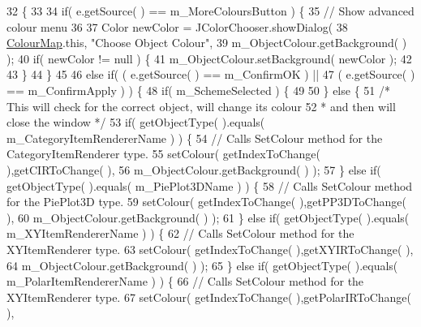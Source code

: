 \begin{DoxyCode}
32                                                  \{
33         
34         \textcolor{keywordflow}{if}( e.getSource(  ) == m\_MoreColoursButton ) \{
35             \textcolor{comment}{// Show advanced colour menu}
36             
37             Color newColor = JColorChooser.showDialog( 
38                                 \hyperlink{class_colour_map}{ColourMap}.this, \textcolor{stringliteral}{"Choose Object Colour"},
39                                 m\_ObjectColour.getBackground(  ) );
40             \textcolor{keywordflow}{if}(  newColor != null ) \{
41                 m\_ObjectColour.setBackground( newColor );
42                 
43             \}
44         \}
45         
46         \textcolor{keywordflow}{else} \textcolor{keywordflow}{if}(  ( e.getSource(  ) == m\_ConfirmOK ) ||
47                   (  e.getSource(  ) == m\_ConfirmApply ) ) \{
48             \textcolor{keywordflow}{if}( m\_SchemeSelected ) \{
49                 
50             \} \textcolor{keywordflow}{else} \{
51                 \textcolor{comment}{/* This will check for the correct object, will change its colour
}
52 \textcolor{comment}{                 * and then will close the window */}
53                 \textcolor{keywordflow}{if}( getObjectType(  ).equals( m\_CategoryItemRendererName ) ) \{
54                     \textcolor{comment}{// Calls SetColour method for the CategoryItemRenderer type.}
55                     setColour( getIndexToChange(  ),getCIRToChange(  ),
56                               m\_ObjectColour.getBackground(  ) );
57                 \} \textcolor{keywordflow}{else} \textcolor{keywordflow}{if}( getObjectType(  ).equals( m\_PiePlot3DName ) ) \{
58                     \textcolor{comment}{// Calls SetColour method for the PiePlot3D type.}
59                     setColour( getIndexToChange(  ),getPP3DToChange(  ),
60                               m\_ObjectColour.getBackground(  ) );
61                 \} \textcolor{keywordflow}{else} \textcolor{keywordflow}{if}( getObjectType(  ).equals( m\_XYItemRendererName ) ) \{
62                     \textcolor{comment}{// Calls SetColour method for the XYItemRenderer type.}
63                     setColour( getIndexToChange(  ),getXYIRToChange(  ),
64                               m\_ObjectColour.getBackground(  ) );
65                 \} \textcolor{keywordflow}{else} \textcolor{keywordflow}{if}( getObjectType(  ).equals( m\_PolarItemRendererName ) ) \{
66                     \textcolor{comment}{// Calls SetColour method for the XYItemRenderer type.}
67                     setColour( getIndexToChange(  ),getPolarIRToChange(  ),

\end{DoxyCode}
